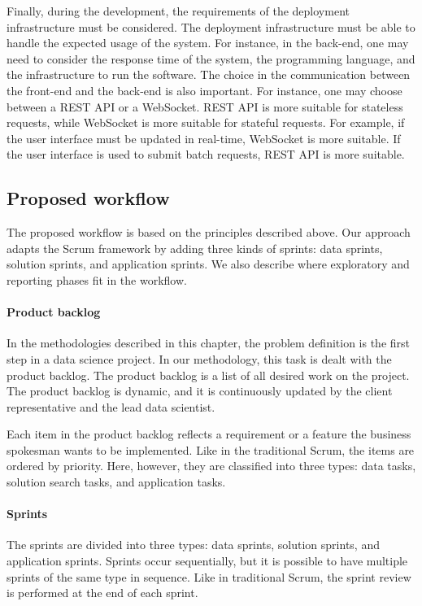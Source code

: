 Finally, during the development, the requirements of the deployment infrastructure must be
considered.  The deployment infrastructure must be able to handle the expected usage
of the system.  For instance, in the back-end, one may need to consider the response time
of the system, the programming language, and the infrastructure to run the software.
The choice in the communication between the front-end and the back-end is also important.
For instance, one may choose between a REST API or a WebSocket.  REST API is more suitable
for stateless requests, while WebSocket is more suitable for stateful requests.  For
example, if the user interface must be updated in real-time, WebSocket is more suitable.
If the user interface is used to submit batch requests, REST API is more suitable.

\subsection{Proposed workflow}

The proposed workflow is based on the principles described above.  Our approach adapts
the Scrum framework by adding three kinds of sprints: data sprints, solution sprints, and
application sprints.  We also describe where exploratory and reporting phases fit in the
workflow.

\paragraph{Product backlog}

In the methodologies described in this chapter, the problem definition is the first step
in a data science project.  In our methodology, this task is dealt with the product
backlog.  The product backlog is a list of all desired work on the project. The product
backlog is dynamic, and it is continuously updated by the client representative and the
lead data scientist.

Each item in the product backlog reflects a requirement or a feature the business
spokesman wants to be implemented.  Like in the traditional Scrum, the items are ordered
by priority.  Here, however, they are classified into three types: data tasks, solution
search tasks, and application tasks.

\paragraph{Sprints}

The sprints are divided into three types: data sprints, solution sprints, and application
sprints.  Sprints occur sequentially, but it is possible to have multiple sprints of the
same type in sequence.  Like in traditional Scrum, the sprint review is performed at the
end of each sprint.

